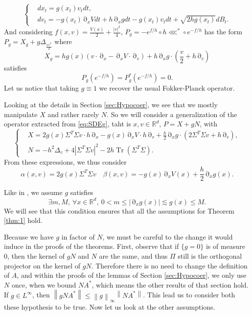 \documentclass[12pt]{amsart}
\newcommand{\R}{\mathbb R}
\newcommand{\Tr}{{\operatorname{Tr}}}
\numberwithin{equation}{section}
\numberwithin{figure}{section}
\DeclareMathOperator{\p}{\partial}
\newcommand{\vvert}[1]{\left\lVert#1\right\rVert}
\begin{document}
\begin{equation}\label{eq:SDEg}
\left\{
\begin{aligned}
&dx_t = g(x_t)v_tdt,\\
&dv_t = -g(x_t)\p_xVdt + h\p_xgdt - g(x_t)v_tdt + \sqrt{2hg(x_t)}dB_t.
\end{aligned}
\right.
\end{equation}
And considering $f(x,v) = \frac{V(x)}{2} + \frac{|v|^2}{4}$, $P_g = -e^{f/h}\circ h\lll^*\circ e^{-f/h}$ has the form $P_g = X_g + g\Delta_{\frac{|v|^2}{4}}$ where
\begin{equation*}
X_g = hg(x)(v\cdot\p_x - \p_xV\cdot\p_v) + h\p_xg\cdot(\frac{v}{2} + h\p_v)
\end{equation*}
satisfies
\begin{equation*}
P_g(e^{-f/h}) = P_g^*(e^{-f/h}) = 0.
\end{equation*}
Let us notice that taking $g\equiv 1$ we recover the usual Fokker-Planck operator.

Looking at the details in Section \ref{sec:Hypocoer}, we see that we mostly manipulate $X$ and rather rarely $N$. So we will consider a generalization of the operator extracted from \eqref{eq:SDEg}, taht is $x,v\in\R^d$, $P = X + gN$, with
\begin{equation*}
\left\{
\begin{aligned}
&X = 2g(x)\Sigma^T\Sigma v\cdot h\p_x - g(x)\p_xV\cdot h\p_v + \frac h2\p_xg\cdot(2\Sigma^T\Sigma v + h\p_v),\\
&N = -h^2\Delta_v + 4|\Sigma^T\Sigma v|^2 - 2h\Tr(\Sigma^T\Sigma).
\end{aligned}
\right.
\end{equation*}
From these expressions, we thus consider
\begin{equation*}
\alpha(x,v) = 2g(x)\Sigma^T\Sigma v\quad \beta(x,v) = - g(x)\p_xV(x) + \frac h2\p_xg(x).
\end{equation*}

Like in \cite{LeLeLaHi24}, we assume $g$ satisfies
\begin{equation}\label{eq:assgExample3}
\exists m,M,\ \forall x\in\R^d,\ 0 < m \leq |\p_xg(x)| \lesssim g(x) \leq M.
\end{equation}
We will see that this condition ensures that all the assumptions for Theorem \ref{thm:1} hold.

Because we have $g$ in factor of $N$, we must be careful to the change it would induce in the proofs of the theorems. First, observe that if $\{g = 0\}$ is of measure $0$, then the kernel of $gN$ and $N$ are the same, and thus $\Pi$ still is the orthogonal projector on the kernel of $gN$. Therefore there is no need to change the definition of $A$, and within the proofs of the lemmas of Section \ref{sec:Hypocoer}, we only use $N$ once, when we bound $NA^*$, which means the other results of that section hold. If $g\in L^\infty$, then $\vvert{gNA^*} \leq \vvert{g}_\infty \vvert{NA^*}$. This lead us to consider both these hypothesis to be true. Now let us look at the other assumptions.
\end{document}
